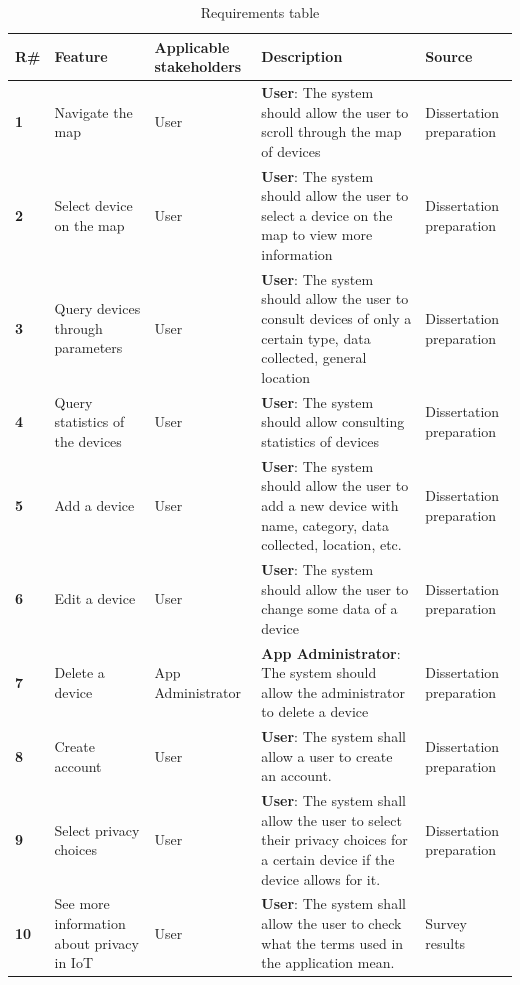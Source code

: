 \begin{table}[H]
    \centering
    \begin{adjustbox}{width=1\textwidth,center=\textwidth}
    \begin{tabular}{|l|p{}|p{}|p{}|p{}|}
        \hline
        \rowcolor{green!20}
        \textbf{R\#} & \textbf{Feature} & \textbf{Applicable stakeholders} & \textbf{Description} & \textbf{Source} \\
        \hline
        \textbf{1} & Navigate the map & User & \textbf{User}: The system should allow the user to scroll through the map of devices & Dissertation preparation \\
        \hline
        \textbf{2} & Select device on the map & User & \textbf{User}: The system should allow the user to select a device on the map to view more information & Dissertation preparation \\
        \hline
        \textbf{3} & Query devices through parameters & User & \textbf{User}: The system should allow the user to consult devices of only a certain type, data collected, general location & Dissertation preparation \\
        \hline
        \textbf{4} & Query statistics of the devices & User & \textbf{User}: The system should allow consulting statistics of devices & Dissertation preparation \\
        \hline
        \textbf{5} & Add a device & User & \textbf{User}: The system should allow the user to add a new device with name, category, data collected, location, etc. & Dissertation preparation \\
        \hline
        \textbf{6} & Edit a device & User & \textbf{User}: The system should allow the user to change some data of a device & Dissertation preparation \\
        \hline
        \textbf{7} & Delete a device & App Administrator & \textbf{App Administrator}: The system should allow the administrator to delete a device & Dissertation preparation \\
        \hline
        \textbf{8} & Create account & User & \textbf{User}: The system shall allow a user to create an account. & Dissertation preparation \\
        \hline
        \textbf{9} & Select privacy choices & User & \textbf{User}: The system shall allow the user to select their privacy choices for a certain device if the device allows for it. & Dissertation preparation \\
        \hline
        \textbf{10} & See more information about privacy in IoT & User & \textbf{User}: The system shall allow the user to check what the terms used in the application mean. & Survey results \\
        \hline
    \end{tabular}
    \end{adjustbox}
    \vspace{1em}
    \caption{Requirements table}
    \label{table:table1}
\end{table}

